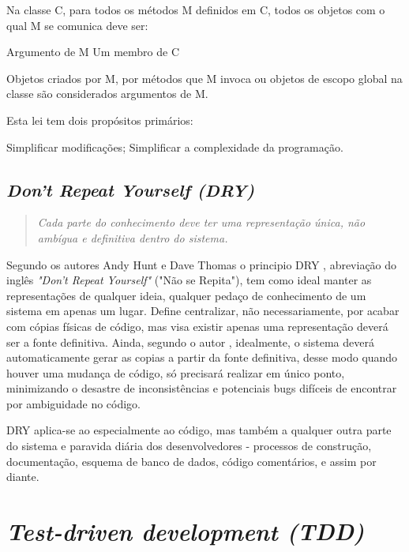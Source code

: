 \documentclass[12pt]{article}
\begin{document}
Na classe C, para todos os métodos M definidos em C, todos os objetos com o qual M se comunica deve ser:

    Argumento de M
    Um membro de C

Objetos criados por M, por métodos que M invoca ou objetos de escopo global na classe são considerados argumentos de M.

Esta lei tem dois propósitos primários:

    Simplificar modificações;
    Simplificar a complexidade da programação.


\subsection{\textit{Don't Repeat Yourself (DRY)}} \label{sec:dey}

\begin{quote}
\textit{Cada parte do conhecimento deve ter uma representação única, não ambígua e definitiva dentro do sistema.}
\end{quote}

Segundo os autores Andy Hunt e Dave Thomas \cite{KEEP_IT_DRY_SHY} o principio DRY \cite{THE_PRAGMATIC_PROGRAMMER}, abreviação do inglês \textit{"Don't Repeat Yourself"} ("Não se Repita"), tem como ideal manter as representações de qualquer ideia, qualquer pedaço de conhecimento de um sistema em apenas um lugar.
Define centralizar, não necessariamente, por acabar com cópias físicas de código, mas visa existir apenas uma representação deverá ser a fonte definitiva.
Ainda, segundo o autor \cite{KEEP_IT_DRY_SHY}, idealmente, o sistema deverá automaticamente gerar as copias a partir da fonte definitiva, desse modo quando houver uma mudança de código, só precisará realizar em único ponto, minimizando o desastre de inconsistências e potenciais bugs difíceis de encontrar por ambiguidade no código. 

DRY aplica-se ao especialmente ao código, mas também a qualquer outra parte do sistema e paravida diária dos desenvolvedores - processos de construção, documentação, esquema de banco de dados, código comentários, e assim por diante.

\section{\textsl{Test-driven development (TDD)}} \label{sec:tdd}
\end{document}

